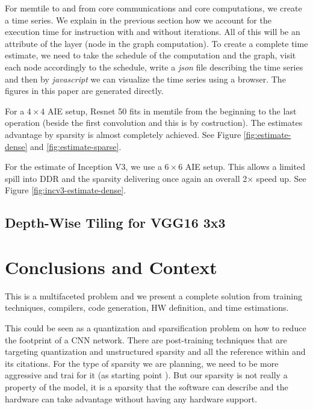 \documentclass[conference]{IEEEtran}
\begin{document}
For memtile to and from core communications and core computations, we
create a time series. We explain in the previous section how we
account for the execution time for instruction with and without
iterations. All of this will be an attribute of the layer (node in the
graph computation).  To create a complete time estimate, we need to
take the schedule of the computation and the graph, visit each node
accordingly to the schedule, write a {\em json} file describing the
time series and then by {\em javascript} we can visualize the time
series using a browser. The figures in this paper are generated
directly.

For a $4\times 4$ AIE setup, Resnet 50 fits in memtile from the
beginning to the last operation (beside the first convolution and this
is by costruction). The estimates advantage by sparsity is almost
completely achieved.  See Figure \ref{fig:estimate-dense} and
\ref{fig:estimate-sparse}.

For the estimate of Inception V3, we use a $6\times 6$ AIE setup.
This allows a limited spill into DDR and the sparsity delivering once
again an overall 2$\times$ speed up. See Figure
\ref{fig:incv3-estimate-dense}.


\subsection{Depth-Wise Tiling for VGG16 3x3}
\label{sec:res-depth}





\section{Conclusions and Context}
This is a multifaceted problem and we present a complete solution from
training techniques, compilers, code generation, HW definition, and
time estimations.

This could be seen as a quantization and sparsification problem on how
to reduce the footprint of a CNN network. There are post-training
techniques that are targeting quantization and unstructured sparsity
\cite{frantar2023gptq} and all the reference within and its
citations. For the type of sparsity we are planning, we need to be
more aggressive and trai for it (as starting point
\cite{abs-2102-11289}).  But our sparsity is not really a property of
the model, it is a sparsity that the software can describe and the
hardware can take advantage without having any hardware support.
\end{document}
